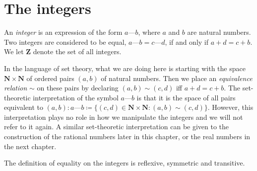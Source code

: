 \section{The integers}\label{sec 4.1}

\begin{definition}[Integers]\label{4.1.1}
    An \emph{integer} is an expression of the form \(a \text{---} b\), where \(a\) and \(b\) are natural numbers.
    Two integers are considered to be equal, \(a \text{---} b = c \text{---} d\), if and only if \(a + d = c + b\).
    We let \(\mathbf{Z}\) denote the set of all integers.
\end{definition}

\begin{note}
    In the language of set theory, what we are doing here is starting with the space \(\mathbf{N} \times \mathbf{N}\) of ordered pairs \((a, b)\) of natural numbers.
    Then we place an \emph{equivalence relation} \(\sim\) on these pairs by declaring \((a, b) \sim (c, d)\) iff \(a + d = c + b\).
    The set-theoretic interpretation of the symbol \(a \text{---} b\) is that it is the space of all pairs equivalent to \((a, b): a \text{---} b \coloneqq \{(c, d) \in \mathbf{N} \times \mathbf{N} : (a, b) \sim (c, d)\}\).
    However, this interpretation plays no role in how we manipulate the integers and we will not refer to it again.
    A similar set-theoretic interpretation can be given to the construction of the rational numbers later in this chapter, or the real numbers in the next chapter.
\end{note}

\begin{additional corollary}\label{ac 4.1.1}
The definition of equality on the integers is reflexive, symmetric and transitive.
\end{additional corollary}

